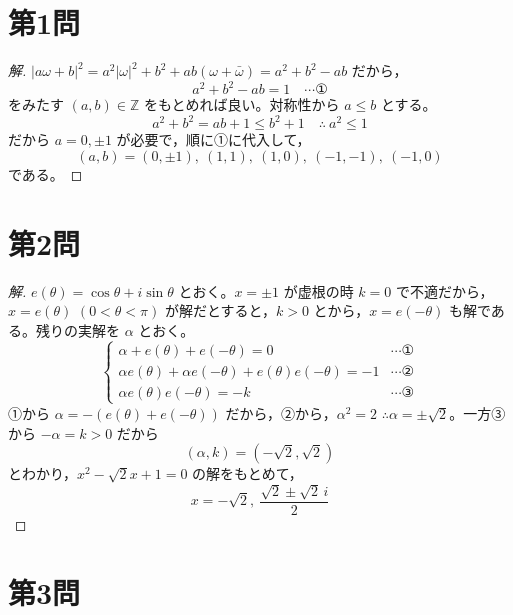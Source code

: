 \documentclass[../main.tex]{subfiles}
\begin{document}
\section*{第1問}

\begin{proof}[解]
  $|a\omega+b|^2 = a^2|\omega|^2+b^2+ab(\omega+\bar\omega) = a^2+b^2-ab$ だから，
  \[
    a^2+b^2-ab=1 \quad \cdots \text{①}
  \]
  をみたす $(a,b)\in\mathbb{Z}$ をもとめれば良い。対称性から $a\le b$ とする。
  \[
    a^2+b^2=ab+1\le b^2+1 \quad\therefore\ a^2\le1
  \]
  だから $a=0,\pm1$ が必要で，順に①に代入して，
  \[
    (a,b)=(0,\pm1),\ (1,1),\ (1,0),\ (-1,-1),\ (-1,0)
  \]
  である。
\end{proof}

\newpage

\section*{第2問}

\begin{proof}[解]
  $e(\theta) = \cos\theta+i\sin\theta$ とおく。$x=\pm1$ が虚根の時 $k=0$ で不適だから，$x=e(\theta)$ $(0<\theta<\pi)$ が解だとすると，$k>0$ とから，$x=e(-\theta)$ も解である。残りの実解を $\alpha$ とおく。
  \[
    \begin{cases}
      \alpha+e(\theta)+e(-\theta)=0 & \cdots \text{①} \\
      \alpha e(\theta)+\alpha e(-\theta)+e(\theta)e(-\theta)=-1 & \cdots \text{②} \\
      \alpha e(\theta)e(-\theta) = -k & \cdots \text{③}
    \end{cases}
  \]
  ①から $\alpha=-(e(\theta)+e(-\theta))$ だから，②から，$\alpha^2=2$ $\therefore \alpha=\pm\sqrt2$。一方③から $-\alpha=k>0$ だから
  \[
    (\alpha,k)=(-\sqrt2,\sqrt2)
  \]
  とわかり，$x^2-\sqrt2x+1=0$ の解をもとめて，
  \[
    x=-\sqrt2,\ \frac{\sqrt2\pm\sqrt2\,i}{2}
  \]
\end{proof}

\newpage

\section*{第3問}
\end{document}
